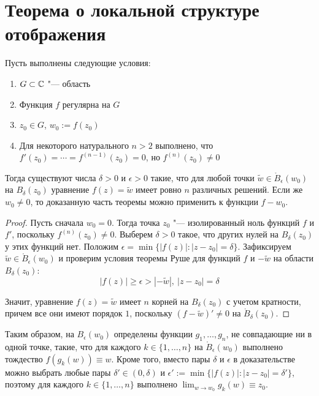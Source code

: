 \section{Теорема о локальной структуре отображения}

\begin{theorem}
	Пусть выполнены следующие условия:
	\begin{enumerate}
		\item $G \subset \mathbb{C}$ "--- область
		\item Функция $f$ регулярна на $G$
		\item $z_0 \in G$, $w_0 := f(z_0)$
		\item Для некоторого натурального $n > 2$ выполнено, что $f'(z_0) = \dotsb = f^{(n - 1)}(z_0) = 0$, но $f^{(n)}(z_0) \ne 0$
	\end{enumerate}
	
	Тогда существуют числа $\delta > 0$ и $\epsilon > 0$ такие, что для любой точки $\widetilde w \in \mathring B_\epsilon(w_0)$ на $B_\delta(z_0)$ уравнение $f(z) = \widetilde w$ имеет ровно $n$ различных решений. Если же $w_0 \ne 0$, то доказанную часть теоремы можно применить к функции $f - w_0$.
\end{theorem}

\begin{proof}
	Пусть сначала $w_0 = 0$. Тогда точка $z_0$ "--- изолированный ноль функций $f$ и $f'$, поскольку $f^{(n)}(z_0) \ne 0$. Выберем $\delta > 0$ такое, что других нулей на $B_\delta(z_0)$ у этих функций нет. Положим $\epsilon = \min\{|f(z)| : |z - z_0| = \delta\}$. Зафиксируем $\widetilde w \in \mathring B_\epsilon(w_0)$ и проверим условия теоремы Руше для функций $f$ и $-\widetilde{w}$ на области $B_\delta(z_0)$:
	\[|f(z)| \ge \epsilon > |-\widetilde{w}|,~|z - z_0| = \delta\]
	
	Значит, уравнение $f(z) = \widetilde w$ имеет $n$ корней на $B_\delta(z_0)$ с учетом кратности, причем все они имеют порядок $1$, поскольку $(f- \widetilde w)' \ne 0$ на $\mathring B_\delta(z_0)$.
\end{proof}

\begin{note}
	Таким образом, на $B_\epsilon(w_0)$ определены функции $g_1, \dotsc, g_n$, не совпадающие ни в одной точке, такие, что для каждого $k \in \{1, \dotsc, n\}$ на $\mathring B_\epsilon(w_0)$ выполнено тождество $f(g_k(w)) \equiv w$. Кроме того, вместо пары $\delta$ и $\epsilon$ в доказательстве можно выбрать любые пары $\delta' \in (0, \delta)$ и $\epsilon' := \min\{|f(z)| : |z - z_0| = \delta'\}$, поэтому для каждого $k \in \{1, \dotsc, n\}$ выполнено $\lim_{w \to w_0}g_k(w) \equiv z_0$.
\end{note}

